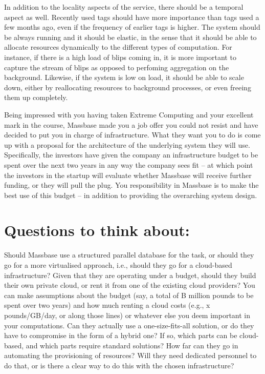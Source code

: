 \documentclass[12pt,twoside,a4paper]{article}
\begin{document}
    In addition to the locality aspects of the service, there should be a temporal aspect as well. Recently used tags should have more importance than tags used a few months ago, even if the frequency of earlier tags is higher.
    The system should be always running and it should be elastic, in the sense that it should be able to allocate resources dynamically to the different types of computation. For instance, if there is a high load of blips coming in, it is more important to capture the stream of blips as opposed to perfoming aggregation on the background. Likewise, if the system is low on load, it should be able to scale down, either by reallocating resources to background processes, or even freeing them up completely. 

Being impressed with you having taken Extreme Computing and your excellent mark in the course, Massbase made you a job offer you could not resist and have decided to put you in charge of infrastructure. What they want you to do is come up with a proposal for the architecture of the underlying system they will use. Specifically, the investors have given the company an infrastructure budget to be spent over the next two years in any way the company sees fit -- at which point the investors in the startup will evaluate whether Massbase will receive further funding, or they will pull the plug. You responsibility in Massbase is to make the best use of this budget -- in addition to providing the overarching system design.

\section{Questions to think about:}

    Should Massbase use a structured parallel database for the task, or should they go for a more virtualised approach, i.e., should they go for a cloud-based infrastructure?
    Given that they are operating under a budget, should they build their own private cloud, or rent it from one of the existing cloud providers? You can make assumptions about the budget (say, a total of B million pounds to be spent over two years) and how much renting a cloud costs (e.g., x pounds/GB/day, or along those lines) or whatever else you deem important in your computations.
    Can they actually use a one-size-fits-all solution, or do they have to compromise in the form of a hybrid one? If so, which parts can be cloud-based, and which parts require standard solutions?
    How far can they go in automating the provisioning of resources? Will they need dedicated personnel to do that, or is there a clear way to do this with the chosen infrastructure? 
\end{document}
